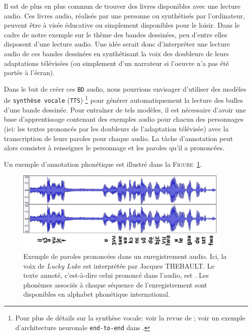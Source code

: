 			Il est de plus en plus commun de trouver des livres disponibles avec une lecture audio.
			Ces livres audio, réalisés par une personne ou synthétisés par l'ordinateur, peuvent être à visée éducative ou simplement disponibles pour le loisir.
			Dans le cadre de notre exemple sur le thème des bandes dessinées, peu d'entre elles disposent d'une lecture audio.
			Une idée serait donc d'interpréter une lecture audio de ces bandes dessinées en synthétisant la voix des doubleurs de leurs adaptations télévisées (ou simplement d'un narrateur si l'oeuvre n'a pas été portée à l'écran).
			
			Dans le but de créer ces \texttt{BD} audio, nous pourrions envisager d'utiliser des modèles de \texttt{synthèse vocale} (\texttt{TTS}) \footnote{
				Pour plus de détails sur la synthèse vocale: voir la revue de \cite{kothadiya-etal:2020:different-methods-review} ; voir un exemple d'architecture neuronale \texttt{end-to-end} dans \cite{mu-etal:2021:review-endtoend-speech}.
			} pour générer automatiquement la lecture des bulles d'une bande dessinée.
			Pour entraîner de tels modèles, il est nécessaire d'avoir une base d'apprentissage contenant des exemples audio pour chacun des personnages (ici: les textes prononcés par les doubleurs de l'adaptation télévisée) avec la transcription de leurs paroles pour chaque audio.
			La tâche d'annotation peut alors consister à renseigner le personnage et les paroles qu'il a prononcées.
			
			Un exemple d'annotation phonétique est illustré dans la \textsc{Figure~\ref{figure:2.1.2.D-PRESENTATION-ANNOTATION-EXEMPLES-TRANSCRIPTION}}.
			\begin{leftBarExamples}
				\begin{figure}[H]
					\centering
					\includegraphics[width=0.95\textwidth]{figures/etatdelart-thebault-transcription}
					\caption{
						Exemple de paroles prononcées dans un enregistrement audio.
						Ici, la voix de \textit{Lucky Luke} est interprétée par Jacques THEBAULT.
						Le texte annoté, c'est-à-dire celui prononcé dans l'audio, est  .
						Les phonèmes associés à chaque séquence de l'enregistrement sont disponibles en alphabet phonétique international.
					}
					\label{figure:2.1.2.D-PRESENTATION-ANNOTATION-EXEMPLES-TRANSCRIPTION}
				\end{figure}
			\end{leftBarExamples}
			
